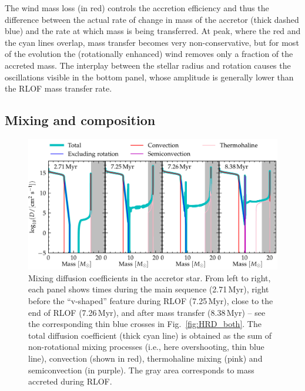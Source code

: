 \documentclass[twocolumn,twocolappendix,trackchanges]{aastex63}
\DeclareRobustCommand{\Figref}[1]{Fig.~\ref{#1}}
\begin{document}
The wind mass loss (in red) controls the accretion efficiency and thus
the difference between the actual rate of change in mass of the
accretor (thick dashed blue) and the rate at which mass is being
transferred. At peak, where the red and the cyan lines overlap, mass
transfer becomes very non-conservative, but for most of the evolution
the (rotationally enhanced) wind removes only a fraction of the
accreted mass. The interplay between the stellar radius and rotation
causes the oscillations visible in the bottom panel, whose amplitude
is generally lower than the RLOF mass transfer rate.

\subsection{Mixing and composition}
\label{sec:mixing}

\begin{figure}[htbp]
  \includegraphics[width=\textwidth]{D_mix}
  \caption{Mixing diffusion coefficients in the accretor star. From
    left to right, each panel shows times during the main sequence
    (2.71\,Myr), right before the ``v-shaped'' feature during RLOF
    (7.25\,Myr), close to the end of RLOF (7.26\,Myr), and
    after mass transfer (8.38\,Myr) -- see the corresponding thin blue
    crosses in \Figref{fig:HRD_both}. The total diffusion
    coefficient (thick cyan line) is obtained as the sum of
    non-rotational mixing processes (i.e., here overshooting, thin
    blue line), convection (shown in red), thermohaline mixing (pink)
    and semiconvection (in purple). The gray area corresponds to mass
    accreted during RLOF.%
  }
  \label{fig:D_mix}
\end{figure}
\end{document}
